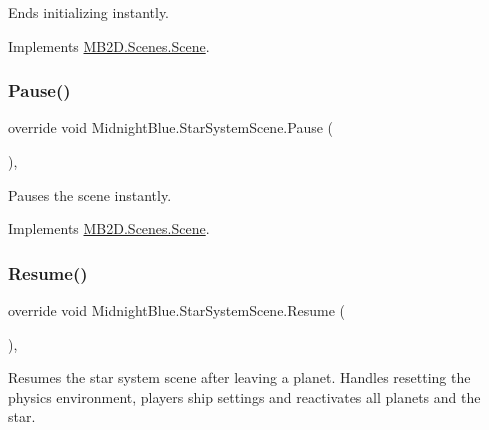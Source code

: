 Ends initializing instantly. 



Implements \hyperlink{class_m_b2_d_1_1_scenes_1_1_scene_a081b4f8866936b495bdce388a7c96c25}{M\+B2\+D.\+Scenes.\+Scene}.

\hypertarget{class_midnight_blue_1_1_star_system_scene_a04e8bfcb31eebfd859c4bd543f0bb6f9}{}\label{class_midnight_blue_1_1_star_system_scene_a04e8bfcb31eebfd859c4bd543f0bb6f9} 
\subsubsection{\texorpdfstring{Pause()}{Pause()}}
{\footnotesize\ttfamily override void Midnight\+Blue.\+Star\+System\+Scene.\+Pause (\begin{DoxyParamCaption}{ }\end{DoxyParamCaption})\hspace{0.3cm}{\ttfamily [inline]}, {\ttfamily [virtual]}}



Pauses the scene instantly. 



Implements \hyperlink{class_m_b2_d_1_1_scenes_1_1_scene_a0661eff0223150fa8e9ea88145409e5d}{M\+B2\+D.\+Scenes.\+Scene}.

\hypertarget{class_midnight_blue_1_1_star_system_scene_aefbf0750a7ce153b923bcabb132e4875}{}\label{class_midnight_blue_1_1_star_system_scene_aefbf0750a7ce153b923bcabb132e4875} 
\subsubsection{\texorpdfstring{Resume()}{Resume()}}
{\footnotesize\ttfamily override void Midnight\+Blue.\+Star\+System\+Scene.\+Resume (\begin{DoxyParamCaption}{ }\end{DoxyParamCaption})\hspace{0.3cm}{\ttfamily [inline]}, {\ttfamily [virtual]}}



Resumes the star system scene after leaving a planet. Handles resetting the physics environment, players ship settings and reactivates all planets and the star. 




